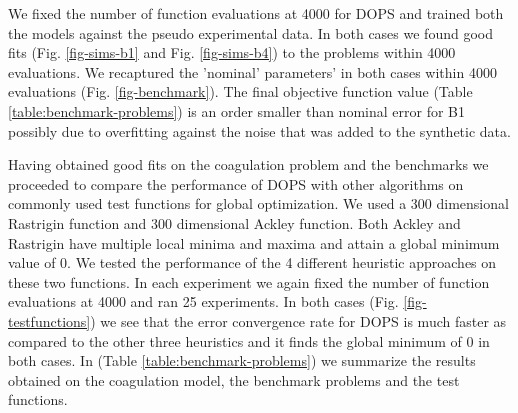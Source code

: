 \documentclass[12pt]{article}
\begin{document}
We fixed the number of function evaluations at 4000 for DOPS and trained both the models against the pseudo experimental data. In both cases we found good fits  (Fig. \ref{fig-sims-b1} and Fig. \ref{fig-sims-b4}) to the problems within 4000 evaluations. We recaptured the 'nominal' parameters' in both cases within 4000 evaluations (Fig. \ref{fig-benchmark}). The final objective function value (Table \ref{table:benchmark-problems}) is an order smaller than nominal error for B1 possibly due to overfitting against the noise that was added to the synthetic data.

Having obtained good fits on the coagulation problem and the benchmarks we proceeded to compare the performance of DOPS with other algorithms on commonly used test functions for global optimization. We used a 300 dimensional Rastrigin function and 300 dimensional Ackley function. Both Ackley and Rastrigin have multiple local minima and maxima and attain a global minimum value of 0. We tested the performance of the 4 different heuristic approaches on these two functions. In each experiment we again fixed the number of function evaluations at 4000 and ran 25 experiments. In both cases (Fig. \ref{fig-testfunctions}) we see that the error convergence rate for DOPS is much faster as compared to the other three heuristics and it finds the global minimum of 0 in both cases. In (Table \ref{table:benchmark-problems}) we summarize the results obtained on the coagulation model, the benchmark problems and the test functions.


\clearpage
\end{document}
